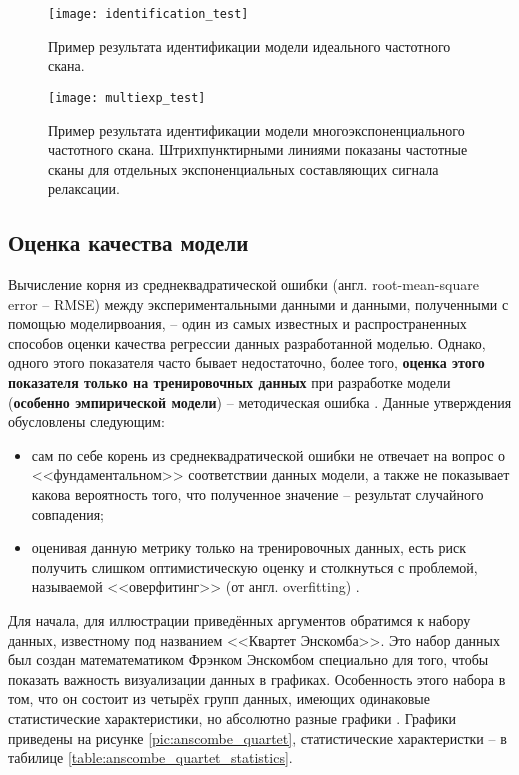     \begin{figure}[!htp]
        \centering
        \texttt{[image: identification\_test]}
        \caption{Пример результата идентификации модели идеального частотного 
        скана.}
        \label{pic:identification_test}
    \end{figure}


    \begin{figure}[!htp]
        \centering
        \texttt{[image: multiexp\_test]}
        \caption{Пример результата идентификации модели многоэкспоненциального
        частотного скана. Штрихпунктирными линиями показаны частотные сканы для
        отдельных экспоненциальных составляющих сигнала релаксации.}
        \label{pic:multiexp_test}
    \end{figure}


    \subsection{Оценка качества модели}
    Вычисление корня из среднеквадратической ошибки (англ. root-mean-square 
    error -- RMSE) между экспериментальными данными и данными, полученными с 
    помощью моделирвоания, -- один из самых известных и распространенных 
    способов оценки качества регрессии данных разработанной моделью. Однако, 
    одного этого показателя часто бывает недостаточно, более того, 
    \textbf{оценка этого показателя только на тренировочных данных} при 
    разработке модели (\textbf{особенно эмпирической модели}) -- методическая 
    ошибка \cite{hands_on_ml, sklearn_cross_validation}. Данные 
    утверждения обусловлены следующим:
    \begin{itemize}
    	\item сам по себе корень из среднеквадратической ошибки не отвечает на 
    	вопрос о <<фундаментальном>> соответствии данных модели, а также не 
    	показывает какова вероятность того, что полученное значение -- результат 
    	случайного совпадения;
    	\item оценивая данную метрику только на тренировочных данных, есть риск
    	получить слишком оптимистическую оценку и столкнуться с проблемой, 
    	называемой <<оверфитинг>> (от англ. overfitting) 
    	\cite{hands_on_ml, sklearn_cross_validation, nikolenko_deep_learning}.
    \end{itemize}

    Для начала, для иллюстрации приведённых аргументов обратимся к набору 
    данных, известному под названием <<Квартет Энскомба>>. Это набор данных был 
    создан математематиком Фрэнком Энскомбом специально для того, чтобы показать
    важность визуализации данных в графиках. Особенность этого набора в том, что
    он состоит из четырёх групп данных, имеющих одинаковые статистические 
    характеристики, но абсолютно разные графики 
    \cite{anscombe_quartet_wikipedia, anscombe_quartet_article}. 
    Графики приведены на рисунке \ref{pic:anscombe_quartet}, статистические 
    характеристки -- в табилице \ref{table:anscombe_quartet_statistics}.

